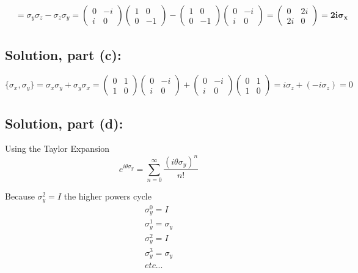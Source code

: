 \documentclass[12pt]{article}
\begin{document}
\begin{align*}
            [\sigma_y, \sigma_z] &= \sigma_y \sigma_z - \sigma_z \sigma_y = \begin{pmatrix} 0 & -i \\ i & 0 \end{pmatrix} \begin{pmatrix} 1 & 0 \\ 0 & -1 \end{pmatrix} - \begin{pmatrix} 1 & 0 \\ 0 & -1 \end{pmatrix} \begin{pmatrix} 0 & -i \\ i & 0 \end{pmatrix} = \begin{pmatrix} 0 & 2i \\ 2i & 0 \end{pmatrix} = \boldsymbol{\boxed{2i \sigma_x}}
        \end{align*}
        
    \subsection{Solution, part (c):}
        \[
        \{\sigma_x, \sigma_y\} = \sigma_x \sigma_y + \sigma_y \sigma_x = \begin{pmatrix} 0 & 1 \\ 1 & 0 \end{pmatrix} \begin{pmatrix} 0 & -i \\ i & 0 \end{pmatrix} + \begin{pmatrix} 0 & -i \\ i & 0 \end{pmatrix} \begin{pmatrix} 0 & 1 \\ 1 & 0 \end{pmatrix} = i\sigma_z + (-i \sigma_z) = 0
        \]
        
    \subsection{Solution, part (d):}
        Using the Taylor Expansion 
        \[
            e^{i \theta \sigma_y} = \sum_{n=0}^\infty \frac{\left( i \theta \sigma_y \right)^n}{n!}
        \]
        
        Because $\sigma_y^2 = I$ the higher powers cycle
        \begin{align*}
            \sigma_y^0 = I \\
            \sigma_y^1 = \sigma_y \\
            \sigma_y^2 = I \\
            \sigma_y^3 = \sigma_y \\  etc...           
        \end{align*}
\end{document}
